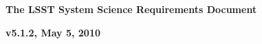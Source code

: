 \documentclass[11pt,letterpaper]{article}
\newcommand{\B}[1]{}
\newcommand{\R}[1]{#1}
\newcommand{\G}[1]{#1}
\begin{document}

\centerline{\Large\bf The LSST System Science Requirements Document}
\centerline{\large\bf v5.1.2, May 5, 2010}













\newpage
\printglossary
\end{document}
